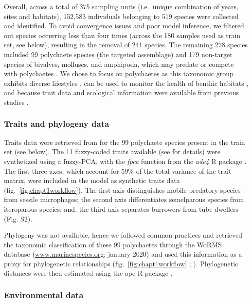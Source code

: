 \documentclass[9pt,biorxiv,doublespacing,lineno]{lapreprint}
\begin{document}
Overall, across a total of 375 sampling units (i.e.~unique combination
of years, sites and habitats), 152,583 individuals belonging to 519
species were collected and identified. To avoid convergence issues and
poor model inference, we filtered out species occurring less than four
times (across the 180 samples used as train set, see below), resulting
in the removal of 241 species. The remaining 278 species included 99
polychaete species (the targeted assemblage) and 179 non-target species
of bivalves, molluscs, and amphipoda, which may predate or compete with
polychaetes \autocites[ ]{Grall_2006}{Jankowska_2019}. We chose to focus
on polychaetes as this taxonomic group exhibits diverse lifestyles
\autocite{Jumars_2015}, can be used to monitor the health of benthic
habitats \autocite{Giangrande_2005}, and because trait data and
ecological information were available from previous studies
\autocite{Boye_2019a}.

\hypertarget{traits-and-phylogeny-data}{%
\subsubsection{Traits and phylogeny
data}\label{traits-and-phylogeny-data}}

Traits data were retrieved from \autocite{Boye_2019a} for the 99
polychaete species present in the train set (see below). The 11
fuzzy-coded traits available (see \textcite{Boye_2019a} for details)
were synthetized using a fuzzy-PCA, with the \emph{fpca} function from
the \emph{ade4} R package \autocite{Thioulouse_2018}. The first three
axes, which account for 59\% of the total variance of the trait matrix,
were included in the model as synthetic traits data
(fig.~\ref{fig:chapt1workflow}). The first axis distinguishes mobile
predatory species from sessile microphages; the second axis
differentiates semelparous species from iteroparous species; and, the
third axis separates burrowers from tube-dwellers (Fig. S2).

Phylogeny was not available, hence we followed common practices
\autocite{Ovaskainen_2020} and retrieved the taxonomic classification of
these 99 polychaetes through the WoRMS database
(\href{https://www.marinespecies.org}{www.marinespecies.org}; january
2020) and used this information as a proxy for phylogenetic
relationships (fig.~\ref{fig:chapt1workflow} ;
\textcite{Ovaskainen_2020}). Phylogenetic distances were then estimated
using the ape R package \autocite{Paradis_2019}.

\hypertarget{environmental-data}{%
\subsubsection{Environmental data}\label{environmental-data}}
\end{document}
